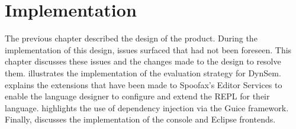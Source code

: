 \chapter{Implementation}
\label{cha:implementation}

The previous chapter described the design of the product. During the
implementation of this design, issues surfaced that had not been foreseen. This
chapter discusses these issues and the changes made to the design to resolve
them.  illustrates the implementation of the
evaluation strategy for DynSem.  explains the
extensions that have been made to Spoofax's Editor Services to enable the
language designer to configure and extend the REPL for their language.
 highlights the use of dependency injection via the Guice
framework. Finally,  discusses the implementation of the
console and Eclipse frontends.










